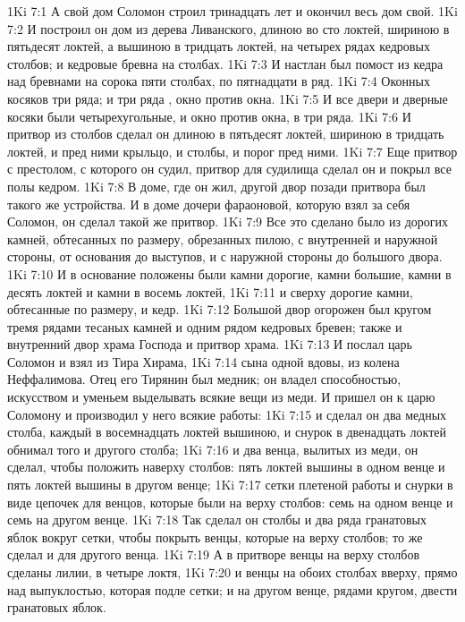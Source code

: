 \vs 1Ki 7:1 А свой дом Соломон строил тринадцать лет и окончил весь дом свой.
\vs 1Ki 7:2 И построил он дом из дерева Ливанского, длиною во сто локтей, шириною в пятьдесят локтей, а вышиною в тридцать локтей, на четырех рядах кедровых столбов; и кедровые бревна  на столбах.
\vs 1Ki 7:3 И настлан был помост из кедра над бревнами на сорока пяти столбах, по пятнадцати в ряд.
\vs 1Ki 7:4 Оконных косяков  три ряда; и три ряда , окно против окна.
\vs 1Ki 7:5 И все двери и дверные косяки были четырехугольные, и окно против окна, в три ряда.
\vs 1Ki 7:6 И притвор из столбов сделал он длиною в пятьдесят локтей, шириною в тридцать локтей, и пред ними крыльцо, и столбы, и порог пред ними.
\vs 1Ki 7:7 Еще притвор с престолом, с которого он судил, притвор для судилища сделал он и покрыл все полы кедром.
\vs 1Ki 7:8 В доме, где он жил, другой двор позади притвора был такого же устройства. И в доме дочери фараоновой, которую взял за себя Соломон, он сделал такой же притвор.
\vs 1Ki 7:9 Все это сделано было из дорогих камней, обтесанных по размеру, обрезанных пилою, с внутренней и наружной стороны, от основания до выступов, и с наружной стороны до большого двора.
\vs 1Ki 7:10 И в основание положены были камни дорогие, камни большие, камни в десять локтей и камни в восемь локтей,
\vs 1Ki 7:11 и сверху дорогие камни, обтесанные по размеру, и кедр.
\vs 1Ki 7:12 Большой двор огорожен был кругом тремя рядами тесаных камней и одним рядом кедровых бревен; также и внутренний двор храма Господа и притвор храма.
\rsbpar\vs 1Ki 7:13 И послал царь Соломон и взял из Тира Хирама,
\vs 1Ki 7:14 сына одной вдовы, из колена Неффалимова. Отец его Тирянин был медник; он владел способностью, искусством и уменьем выделывать всякие вещи из меди. И пришел он к царю Соломону и производил у него всякие работы:
\vs 1Ki 7:15 и сделал он два медных столба, каждый в восемнадцать локтей вышиною, и снурок в двенадцать локтей обнимал  того и другого столба;
\vs 1Ki 7:16 и два венца, вылитых из меди, он сделал, чтобы положить наверху столбов: пять локтей вышины в одном венце и пять локтей вышины в другом венце;
\vs 1Ki 7:17 сетки плетеной работы и снурки в виде цепочек для венцов, которые были на верху столбов: семь на одном венце и семь на другом венце.
\vs 1Ki 7:18 Так сделал он столбы и два ряда гранатовых яблок вокруг сетки, чтобы покрыть венцы, которые на верху столбов; то же сделал и для другого венца.
\vs 1Ki 7:19 А в притворе венцы на верху столбов сделаны  лилии, в четыре локтя,
\vs 1Ki 7:20 и венцы на обоих столбах вверху, прямо над выпуклостью, которая подле сетки; и на другом венце, рядами кругом, двести гранатовых яблок.
